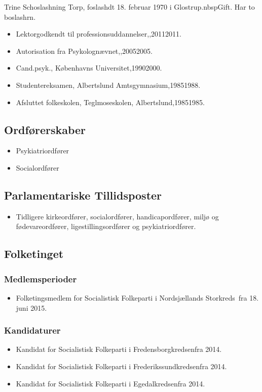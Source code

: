 \documentclass[11pt, a4paper]{awesome-cv}
\begin{document}
\makecvheader[R]
\makelettertitle
\begin{cvletter}
Trine Schoslashning Torp, foslashdt 18. februar 1970 i Glostrup.nbspGift. Har to boslashrn.

\begin{itemize}
\item Lektorgodkendt til professionsuddannelser,,20112011.
\item Autorisation fra Psykolognævnet,,20052005.
\item Cand.psyk., Københavns Universitet,19902000.
\item Studentereksamen, Albertslund Amtsgymnasium,19851988.
\item Afsluttet folkeskolen, Teglmoseskolen, Albertslund,19851985.
\end{itemize}
\subsection*{Ordførerskaber}
\begin{itemize}
\item Psykiatriordfører
\item Socialordfører
\end{itemize}
\subsection*{Parlamentariske Tillidsposter}
\begin{itemize}
\item Tidligere kirkeordfører, socialordfører, handicapordfører, miljø og fødevareordfører, ligestillingsordfører og psykiatriordfører.
\end{itemize}
\subsection*{Folketinget}
\subsubsection*{Medlemsperioder}
\begin{itemize}
\item Folketingsmedlem for Socialistisk Folkeparti i Nordsjællands Storkreds fra 18. juni 2015.
\end{itemize}
\subsubsection*{Kandidaturer}
\begin{itemize}
\item Kandidat for Socialistisk Folkeparti i Fredensborgkredsenfra 2014.
\item Kandidat for Socialistisk Folkeparti i Frederikssundkredsenfra 2014.
\item Kandidat for Socialistisk Folkeparti i Egedalkredsenfra 2014.
\end{itemize}

\end{cvletter}
\end{document}
